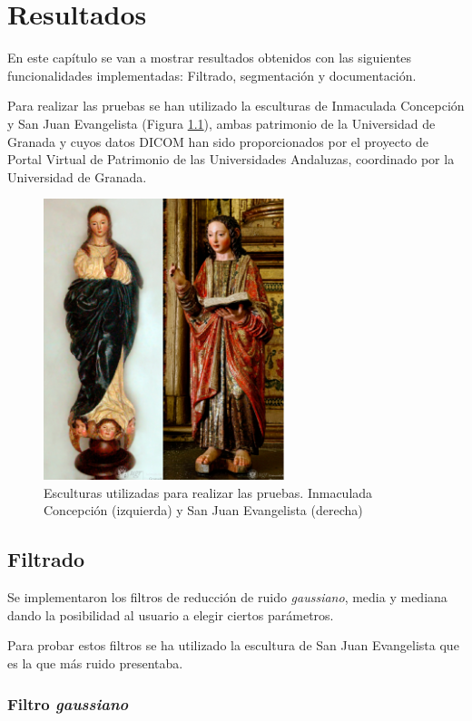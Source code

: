 \chapter{Resultados}

En este capítulo se van a mostrar resultados obtenidos con las siguientes funcionalidades implementadas: Filtrado, segmentación y documentación.

Para realizar las pruebas se han utilizado la esculturas de Inmaculada Concepción y San Juan Evangelista (Figura \ref{fig:resultados/esculturas}), ambas patrimonio de la Universidad de Granada y cuyos datos DICOM han sido proporcionados por el proyecto de Portal Virtual de Patrimonio de las Universidades Andaluzas, coordinado por la Universidad de Granada.

\begin{figure}[H]
	\centering
	\includegraphics[width=7cm]{imagenes/resultados/esculturas}
	\caption{Esculturas utilizadas para realizar las pruebas. Inmaculada Concepción (izquierda) y San Juan Evangelista (derecha)}
	\label{fig:resultados/esculturas}
\end{figure}

\section{Filtrado}

Se implementaron los filtros de reducción de ruido \textit{gaussiano}, media y mediana dando la posibilidad al usuario a elegir ciertos parámetros.

Para probar estos filtros se ha utilizado la escultura de San Juan Evangelista que es la que más ruido presentaba.

\subsection{Filtro \textit{gaussiano}}

